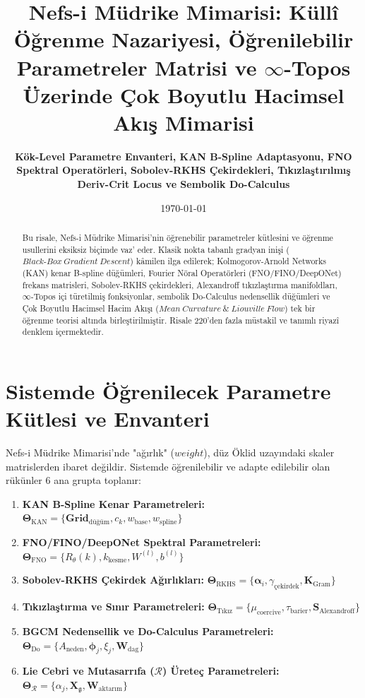\documentclass[11pt, a4paper]{article}
\title{\textbf{Nefs-i Müdrike Mimarisi: Küllî Öğrenme Nazariyesi, Öğrenilebilir Parametreler Matrisi ve $\infty$-Topos Üzerinde Çok Boyutlu Hacimsel Akış Mimarisi}}
\author{\textbf{Kök-Level Parametre Envanteri, KAN B-Spline Adaptasyonu, FNO Spektral Operatörleri, Sobolev-RKHS Çekirdekleri, Tıkızlaştırılmış Deriv-Crit Locus ve Sembolik Do-Calculus}}
\date{\today}
\begin{document}
\maketitle

\begin{abstract}
Bu risale, Nefs-i Müdrike Mimarisi'nin öğrenebilir parametreler kütlesini ve öğrenme usullerini eksiksiz biçimde vaz' eder. Klasik nokta tabanlı gradyan inişi ($Black\text{-}Box\ Gradient\ Descent$) kâmilen ilga edilerek; Kolmogorov-Arnold Networks (KAN) kenar B-spline düğümleri, Fourier Nöral Operatörleri (FNO/FINO/DeepONet) frekans matrisleri, Sobolev-RKHS çekirdekleri, Alexandroff tıkızlaştırma manifoldları, $\infty$-Topos içi türetilmiş fonksiyonlar, sembolik Do-Calculus nedensellik düğümleri ve Çok Boyutlu Hacimsel Hacim Akışı ($Mean\ Curvature\ \&\ Liouville\ Flow$) tek bir öğrenme teorisi altında birleştirilmiştir. Risale 220'den fazla müstakil ve tanımlı riyazî denklem içermektedir.
\end{abstract}

\tableofcontents
\newpage

\section{Sistemde Öğrenilecek Parametre Kütlesi ve Envanteri}

Nefs-i Müdrike Mimarisi'nde "ağırlık" ($weight$), düz Öklid uzayındaki skaler matrislerden ibaret değildir. Sistemde öğrenilebilir ve adapte edilebilir olan rükünler 6 ana grupta toplanır:
\begin{enumerate}
    \item \textbf{KAN B-Spline Kenar Parametreleri:} $\bm{\Theta}_{\text{KAN}} = \{ \mathbf{Grid}_{\text{düğüm}}, c_k, w_{\text{base}}, w_{\text{spline}} \}$
    \item \textbf{FNO/FINO/DeepONet Spektral Parametreleri:} $\bm{\Theta}_{\text{FNO}} = \{ R_\theta(k), k_{\text{kesme}}, W^{(l)}, b^{(l)} \}$
    \item \textbf{Sobolev-RKHS Çekirdek Ağırlıkları:} $\bm{\Theta}_{\text{RKHS}} = \{ \bm{\alpha}_i, \gamma_{\text{çekirdek}}, \mathbf{K}_{\text{Gram}} \}$
    \item \textbf{Tıkızlaştırma ve Sınır Parametreleri:} $\bm{\Theta}_{\text{Tıkız}} = \{ \mu_{\text{coercive}}, \tau_{\text{barier}}, \mathbf{S}_{\text{Alexandroff}} \}$
    \item \textbf{BGCM Nedensellik ve Do-Calculus Parametreleri:} $\bm{\Theta}_{\text{Do}} = \{ A_{\text{neden}}, \bm{\phi}_j, \xi_j, \mathbf{W}_{\text{dag}} \}$
    \item \textbf{Lie Cebri ve Mutasarrıfa ($\mathcal{R}$) Üreteç Parametreleri:} $\bm{\Theta}_{\mathcal{R}} = \{ \alpha_j, \mathbf{X}_{\mathfrak{g}}, \mathbf{W}_{\text{aktarım}} \}$
\end{enumerate}
\end{document}
